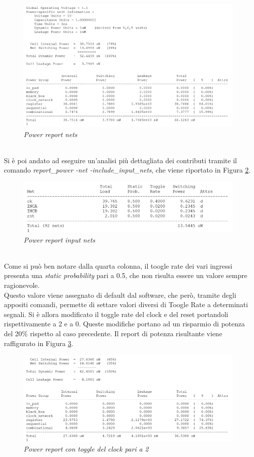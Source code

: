 \begin{figure}[!htb]
	\centering
	\includegraphics[scale=0.8]{immagini/3_1}
	\caption{\textit{Power report nets}}
	\label{3_1}
\end{figure}
\\
Si è poi andato ad eseguire un'analisi più dettagliata dei contributi tramite il comando \textit{report\_power -net -include\_input\_nets}, che viene riportato in Figura \ref{3_2}. \\
\begin{figure}[!htb]
	\centering
	\includegraphics[scale=0.8]{immagini/3_2}
	\caption{\textit{Power report input nets}}
	\label{3_2}
\end{figure}
\\
Come si può ben notare dalla quarta colonna, il toogle rate dei vari ingressi presenta una \textit{static probability} pari a 0.5, che non risulta essere un valore sempre ragionevole. \\
Questo valore viene assegnato di default dal software, che però, tramite degli appositi comandi, permette di settare valori diversi di Toogle Rate a determinati segnali. Si è allora modificato il toggle rate del clock e del reset portandoli rispettivamente a 2 e a 0. Queste modifiche portano ad un risparmio di potenza del 20\% rispetto al caso precedente. Il report di potenza risultante viene raffigurato in Figura \ref{3_3}.
\begin{figure}[!htb]
	\centering
	\includegraphics[scale=0.8]{immagini/3_3}
	\caption{\textit{Power report con toggle del clock pari a 2}}
	\label{3_3}
\end{figure}
